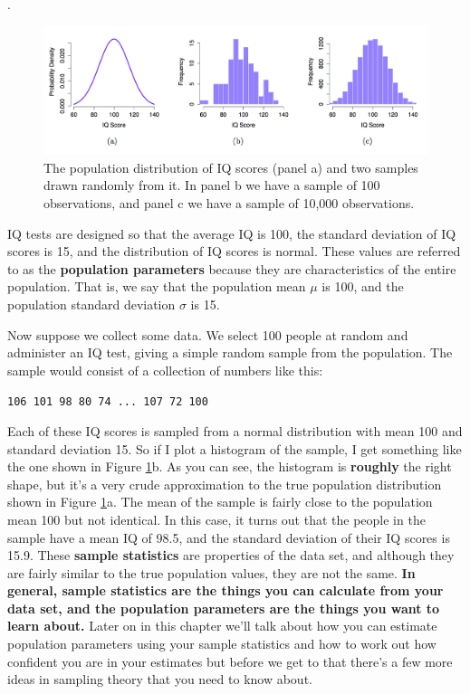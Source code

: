 \documentclass[
]{book}
\begin{document}
.

\begin{figure}
\centering
\includegraphics{figures/navIQ.png}
\caption{\label{fig:IQdist}The population distribution of IQ scores (panel a) and two samples drawn randomly from it. In panel b we have a sample of 100 observations, and panel c we have a sample of 10,000 observations.}
\end{figure}

IQ tests are designed so that the average IQ is 100, the standard deviation of IQ scores is 15, and the distribution of IQ scores is normal. These values are referred to as the \textbf{population parameters} because they are characteristics of the entire population. That is, we say that the population mean \(\mu\) is 100, and the population standard deviation \(\sigma\) is 15.

Now suppose we collect some data. We select 100 people at random and administer an IQ test, giving a simple random sample from the population. The sample would consist of a collection of numbers like this:

\texttt{106\ 101\ 98\ 80\ 74\ ...\ 107\ 72\ 100}

Each of these IQ scores is sampled from a normal distribution with mean 100 and standard deviation 15. So if I plot a histogram of the sample, I get something like the one shown in Figure \ref{fig:IQdist}b. As you can see, the histogram is \textbf{roughly} the right shape, but it's a very crude approximation to the true population distribution shown in Figure \ref{fig:IQdist}a. The mean of the sample is fairly close to the population mean 100 but not identical. In this case, it turns out that the people in the sample have a mean IQ of 98.5, and the standard deviation of their IQ scores is 15.9. These \textbf{sample statistics} are properties of the data set, and although they are fairly similar to the true population values, they are not the same. \textbf{In general, sample statistics are the things you can calculate from your data set, and the population parameters are the things you want to learn about.} Later on in this chapter we'll talk about how you can estimate population parameters using your sample statistics and how to work out how confident you are in your estimates but before we get to that there's a few more ideas in sampling theory that you need to know about.
\end{document}
